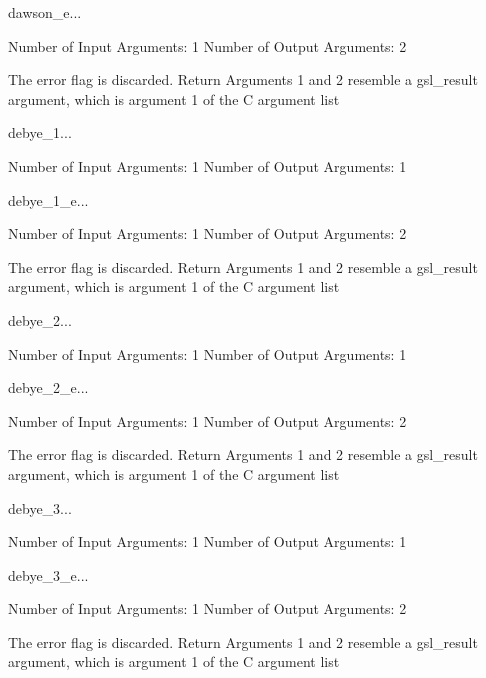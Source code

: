 \begin{funcdesc}{dawson_e}{...}

    Number of Input  Arguments:  1
    Number of Output Arguments:  2

The error flag is discarded.
Return Arguments 1 and 2 resemble a gsl_result argument,
	which is  argument 1 of the C argument list

\end{funcdesc}

\begin{funcdesc}{debye_1}{...}

    Number of Input  Arguments:  1
    Number of Output Arguments:  1
\end{funcdesc}

\begin{funcdesc}{debye_1_e}{...}

    Number of Input  Arguments:  1
    Number of Output Arguments:  2

The error flag is discarded.
Return Arguments 1 and 2 resemble a gsl_result argument,
	which is  argument 1 of the C argument list

\end{funcdesc}

\begin{funcdesc}{debye_2}{...}

    Number of Input  Arguments:  1
    Number of Output Arguments:  1
\end{funcdesc}

\begin{funcdesc}{debye_2_e}{...}

    Number of Input  Arguments:  1
    Number of Output Arguments:  2

The error flag is discarded.
Return Arguments 1 and 2 resemble a gsl_result argument,
	which is  argument 1 of the C argument list

\end{funcdesc}

\begin{funcdesc}{debye_3}{...}

    Number of Input  Arguments:  1
    Number of Output Arguments:  1
\end{funcdesc}

\begin{funcdesc}{debye_3_e}{...}

    Number of Input  Arguments:  1
    Number of Output Arguments:  2

The error flag is discarded.
Return Arguments 1 and 2 resemble a gsl_result argument,
	which is  argument 1 of the C argument list

\end{funcdesc}

